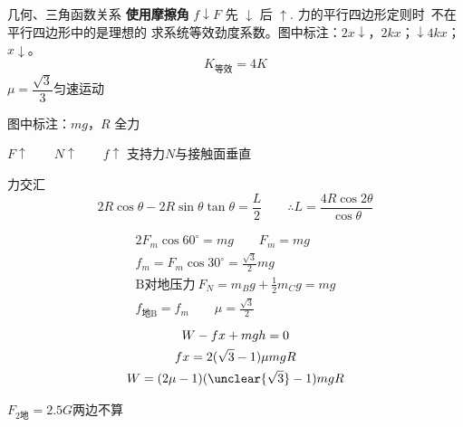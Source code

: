 \par 几何、三角函数关系 %
\textbf{使用摩擦角}
$f\downarrow$\quad $F$ 先 $\downarrow$ 后 $\uparrow$.
力的平行四边形定则时\ 不在平行四边形中的是理想的
求系统等效劲度系数。图中标注：$2x\downarrow$，$2kx$；$\downarrow4kx$；$x\downarrow$。
\[
K_{\text{等效}}=4K
\]
$\mu=\dfrac{\sqrt{3}}{3}$\quad 匀速运动

图中标注：$mg$，$R$ 全力

$F\uparrow\qquad N\uparrow\qquad f\uparrow$
支持力$N$与接触面垂直

力交汇%
\[
2R\cos\theta-2R\sin\theta\tan\theta=\frac{L}{2}\qquad \therefore L=\frac{4R\cos2\theta}{\cos\theta}
\]

\begin{gather*}
2F_m\cos60^\circ=mg\qquad F_m=mg\\
f_m=F_m\cos30^\circ=\frac{\sqrt{3}}{2}mg\\
\text{B对地压力}\ F_N=m_Bg+\tfrac12 m_Cg=mg\\
f_{\text{地B}}=f_m\qquad \mu=\frac{\sqrt{3}}{2}
\end{gather*}
\begin{gather*}
W-fx+mgh=0\\
fx=2(\sqrt{3}-1)\mu mgR\\
W=(2\mu-1)(\unclear{\sqrt{3}}-1)mgR
\end{gather*}

$F_{2\text{地}}=2.5G$\quad 两边不算
